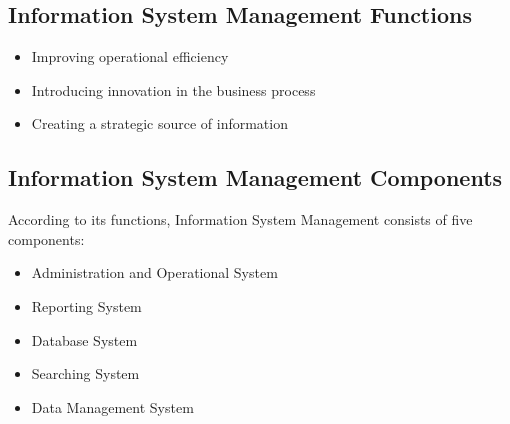 \documentclass[12pt,titlepage]{article}
\begin{document}
\subsection{Information System Management Functions}
\begin{itemize}
    \item Improving operational efficiency
    \item Introducing innovation in the business process
    \item Creating a strategic source of information
\end{itemize}

\subsection{Information System Management Components}
According to its functions, Information System Management consists of five components:
\begin{itemize}
    \item Administration and Operational System
    \item Reporting System
    \item Database System
    \item Searching System
    \item Data Management System
\end{itemize}
\end{document}

